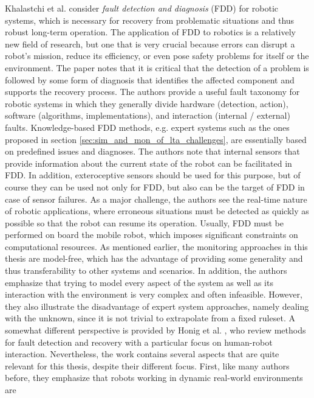\documentclass[english, master, utf8]{base/thesis_KBS}
\begin{document}
Khalastchi et al. consider \textit{fault detection and diagnosis} (FDD) for robotic systems, which is necessary for recovery from problematic situations and thus
robust long-term operation. \cite{Khalastchi:2018} The application of FDD to robotics is a relatively new field of research, but one that is very crucial
because errors can disrupt a robot's mission, reduce its efficiency, or even pose safety problems for itself or the environment. \cite{Khalastchi:2018} The paper notes that it is
critical that the detection of a problem is followed by some form of diagnosis that identifies the affected component and supports the recovery process. The authors provide a useful
fault taxonomy for robotic systems in which they generally divide hardware (detection, action), software (algorithms, implementations), and interaction (internal / external) faults.
Knowledge-based FDD methods, e.g. expert systems such as the ones proposed in section \ref{sec:sim_and_mon_of_lta_challenges}, are essentially based on predefined issues and
diagnoses. \cite{Khalastchi:2018} The authors note that internal sensors that provide information about the current state of the robot can be facilitated in FDD. In addition,
exteroceptive sensors should be used for this purpose, but of course they can be used not only for FDD, but also can be the target of FDD in case of sensor failures. \cite{Khalastchi:2018}
As a major challenge, the authors see the real-time nature of robotic applications, where erroneous situations must be detected as quickly as possible so that the robot can resume
its operation. Usually, FDD must be performed on board the mobile robot, which imposes significant constraints on computational resources. \cite{Khalastchi:2018} As mentioned earlier,
the monitoring approaches in this thesis are model-free, which has the advantage of providing some generality and thus transferability to other systems and scenarios. \cite{Khalastchi:2018} 
In addition, the authors emphasize that trying to model every aspect of the system as well as its interaction with the environment is very complex and often infeasible.
However, they also illustrate the disadvantage of expert system approaches, namely dealing with the unknown, since it is not trivial to extrapolate from a fixed ruleset.\newline
A somewhat different perspective is provided by Honig et al. \cite{Honig:2018}, who review methods for fault detection and recovery with a particular focus on human-robot interaction. Nevertheless, the work contains several aspects
that are quite relevant for this thesis, despite their different focus. First, like many authors before, they emphasize that robots working in dynamic real-world environments are
\end{document}
